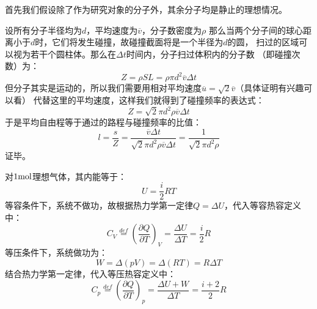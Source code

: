 \documentclass{Physics_H_Notes}
\begin{document}
        \begin{prove}
            首先我们假设除了作为研究对象的分子外，其余分子均是静止的理想情况。
            
            设所有分子半径均为$d$，平均速度为$\overline{v}$，分子数密度为$\rho$
            那么当两个分子间的球心距离小于$d$时，它们将发生碰撞，故碰撞截面将是一个半径为$d$的圆，
            扫过的区域可以视为若干个圆柱体。那么在$\Delta t$时间内，分子扫过体积内的分子数 （即碰撞次数）为：
            \begin{equation}
                Z =\rho SL =\rho \pi d^{2} \overline{v} \Delta t
                \nonumber
            \end{equation}
            但分子其实是运动的，所以我们需要用相对平均速度$\overline{u} = \sqrt{2}\overline{v}$（具体证明有兴趣可以看）
            代替这里的平均速度，这样我们就得到了碰撞频率的表达式：
            \begin{equation}
                Z =\sqrt{2}\pi d^{2} \rho \overline{v} \Delta t
            \end{equation}
            于是平均自由程等于通过的路程与碰撞频率的比值：
            \begin{equation}
                l = \frac{s}{Z} = \frac{\overline{v}\Delta t }{\sqrt{2}\pi d^{2} \rho \overline{v} \Delta t} = \frac{1}{\sqrt{2}\pi d^{2} \rho}
            \end{equation}
            证毕。
        \end{prove}
        \begin{prove}
            对$1\rm{mol}$理想气体，其内能等于：
            \begin{equation}
                U = \frac{i}{2}RT
                \nonumber
            \end{equation}
            等容条件下，系统不做功，故根据热力学第一定律$Q = \Delta U$，代入等容热容定义中：
            \begin{equation}
                C_{V} \overset{def}{=} \left(\frac{\partial{Q}}{\partial{T}}\right)_{V} =\frac{\Delta U}{\Delta T}
                =\frac{i}{2}R
            \end{equation}
            等压条件下，系统做功为：
            \begin{equation}
                W = \Delta (pV) = \Delta (RT) =  R\Delta T
                \nonumber
            \end{equation}
            结合热力学第一定律，代入等压热容定义中：
            \begin{equation}
                C_{p} \overset{def}{=} \left(\frac{\partial{Q}}{\partial{T}}\right)_{p} = \frac{\Delta U + W}{\Delta T} 
                = \frac{i+2}{2}R
            \end{equation}
        \end{prove}
\end{document}
